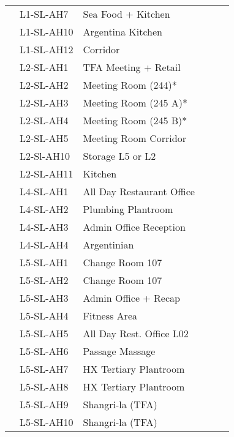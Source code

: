 \begin{table}[htbp]
\begin{tabular}{llp{3.2cm} c c l}
\inc	 	 &L1-SL-AH7	 &Sea Food + Kitchen	 	&\checkmark&  &\\
 
\inc	 	 &L1-SL-AH10	 &Argentina Kitchen	 	&\checkmark & &\\
 
\inc	 	 &L1-SL-AH12	 &Corridor	 	 	&\checkmark  & &\\
\midrule

\inc	 	 &L2-SL-AH1	 &TFA Meeting + Retail	&\checkmark && \\
\inc	 	 &L2-SL-AH2	 &Meeting Room (244)*	& \checkmark	 && \\
\inc	 	 &L2-SL-AH3	 &Meeting Room (245 A)*	 &\checkmark&	 & \\
\inc	 	 &L2-SL-AH4	 &Meeting Room (245 B)*	 &\checkmark && \\
\inc	 	 &L2-SL-AH5	 &Meeting Room Corridor	 &\checkmark  && \\

\inc	 	 &L2-Sl-AH10	 &Storage L5 or L2	 	&\checkmark & &\\
\inc  	 &L2-SL-AH11	 &Kitchen	 	 	&\checkmark  && \\
\midrule 

\inc  	 &L4-SL-AH1	 &All Day Restaurant Office	&\checkmark &    &\\
\inc	 	 &L4-SL-AH2	 &Plumbing Plantroom	 	&\checkmark  & &\\
\inc	 	 &L4-SL-AH3	 &Admin Office Reception	 &\checkmark  &&\\
\inc	 	 &L4-SL-AH4	 &Argentinian	 	 	 &\checkmark & &\\
\midrule 

\inc 	 &L5-SL-AH1	 &Change Room 107	 	 &\checkmark & &\\
\inc	 	 &L5-SL-AH2	 &Change Room 107	 	 &\checkmark	& & \\
\inc	 	 &L5-SL-AH3	 &Admin Office + Recap	 &\checkmark	 &&\\
\inc	 	 &L5-SL-AH4	 &Fitness Area	  		 &\checkmark	 &&\\
\inc	 	 &L5-SL-AH5	 &All Day Rest. Office L02	&\checkmark &	 &\\
\inc	 	 &L5-SL-AH6	 &Passage Massage	 	 &\checkmark	 & &\\
\inc	 	 &L5-SL-AH7	 &HX Tertiary Plantroom	 &\checkmark	 &&\\
\inc	 	 &L5-SL-AH8	 &HX Tertiary Plantroom	 &\checkmark	 & &\\
\inc	 	 &L5-SL-AH9	 &Shangri-la (TFA)	 	 &\checkmark	 & &\\
\inc	 	 &L5-SL-AH10	 &Shangri-la (TFA)	 	 &\checkmark	 & &\\



\end{tabular}
\end{table}
